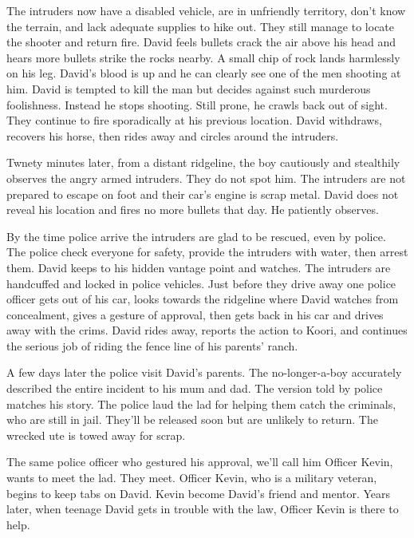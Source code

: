 The intruders now have a disabled vehicle, are in unfriendly territory, don't know the terrain, and lack adequate supplies to hike out.  They still manage to locate the shooter and return fire.  David feels bullets crack the air above his head and hears more bullets strike the rocks nearby. A small chip of rock lands harmlessly on his leg.  David's blood is up and he can clearly see one of the men shooting at him. David is tempted to kill the man but decides against such murderous foolishness. Instead he stops shooting. Still prone, he crawls back out of sight.  They continue to fire sporadically at his previous location.  David withdraws, recovers his horse, then rides away and circles around the intruders.

Twnety minutes later, from a distant ridgeline, the boy cautiously and stealthily observes the angry armed intruders. They do not spot him. The intruders are not prepared to escape on foot and their car's engine is scrap metal. David does not reveal his location and fires no more bullets that day.  He patiently observes.

By the time police arrive the intruders are glad to be rescued, even by police.   The police check everyone for safety, provide the intruders with water, then arrest them.  David keeps to his hidden vantage point and watches.   The intruders are handcuffed and locked in police vehicles.  Just before they drive away one police officer gets out of his car, looks towards the ridgeline where David watches from concealment, gives a gesture of approval, then gets back in his car and drives away with the crims.  David rides away, reports the action to Koori, and continues the serious job of riding the fence line of his parents' ranch.

A few days later the police visit David's parents.  The no-longer-a-boy accurately described the entire incident to his mum and dad.  The version told by police matches his story.  The police laud the lad for helping them catch the criminals, who are still in jail. They'll be released soon but are unlikely to return. The wrecked ute is towed away for scrap.

The same police officer who gestured his approval, we'll call him Officer Kevin, wants to meet the lad.  They meet.  Officer Kevin, who is a military veteran, begins to keep tabs on David.  Kevin become David's friend and mentor.  Years later, when teenage David gets in trouble with the law, Officer Kevin is there to help.

\chapterreturn
